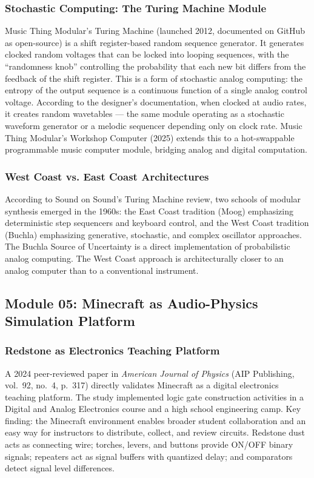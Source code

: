\documentclass[11pt,letterpaper]{article}
\begin{document}
\subsubsection{Stochastic Computing: The Turing Machine Module}

Music Thing Modular's Turing Machine (launched 2012, documented on GitHub as open-source) is a shift register-based random sequence generator. It generates clocked random voltages that can be locked into looping sequences, with the ``randomness knob'' controlling the probability that each new bit differs from the feedback of the shift register. This is a form of stochastic analog computing: the entropy of the output sequence is a continuous function of a single analog control voltage. According to the designer's documentation, when clocked at audio rates, it creates random wavetables --- the same module operating as a stochastic waveform generator or a melodic sequencer depending only on clock rate. Music Thing Modular's Workshop Computer (2025) extends this to a hot-swappable programmable music computer module, bridging analog and digital computation.

\subsubsection{West Coast vs. East Coast Architectures}

According to Sound on Sound's Turing Machine review, two schools of modular synthesis emerged in the 1960s: the East Coast tradition (Moog) emphasizing deterministic step sequencers and keyboard control, and the West Coast tradition (Buchla) emphasizing generative, stochastic, and complex oscillator approaches. The Buchla Source of Uncertainty is a direct implementation of probabilistic analog computing. The West Coast approach is architecturally closer to an analog computer than to a conventional instrument.

\subsection{Module 05: Minecraft as Audio-Physics Simulation Platform}

\subsubsection{Redstone as Electronics Teaching Platform}

A 2024 peer-reviewed paper in \textit{American Journal of Physics} (AIP Publishing, vol.\ 92, no.\ 4, p.\ 317) directly validates Minecraft as a digital electronics teaching platform. The study implemented logic gate construction activities in a Digital and Analog Electronics course and a high school engineering camp. Key finding: the Minecraft environment enables broader student collaboration and an easy way for instructors to distribute, collect, and review circuits. Redstone dust acts as connecting wire; torches, levers, and buttons provide ON/OFF binary signals; repeaters act as signal buffers with quantized delay; and comparators detect signal level differences.
\end{document}
